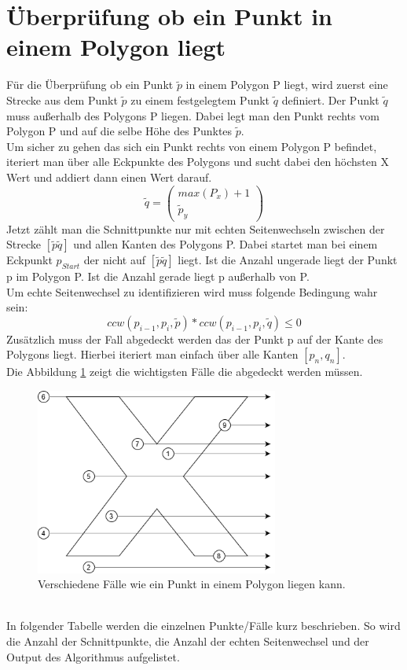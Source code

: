 \documentclass[conference]{IEEEtran}
\begin{document}
	\section{Überprüfung ob ein Punkt in einem Polygon liegt}
	Für die Überprüfung ob ein Punkt $\tilde{p}$ in einem Polygon P liegt, wird zuerst eine Strecke aus dem Punkt $\tilde{p}$ zu einem festgelegtem Punkt $\tilde{q}$ definiert. Der Punkt $\tilde{q}$ muss außerhalb des Polygons P liegen. Dabei legt man den Punkt rechts vom Polygon P und auf die selbe Höhe des Punktes $\tilde{p}$.\\
	Um sicher zu gehen das sich ein Punkt rechts von einem Polygon P befindet, iteriert man über alle Eckpunkte des Polygons und sucht dabei den höchsten X Wert und addiert dann einen Wert darauf.\\
	\[ \tilde{q} = \left(\begin{array}{c}max(P_x)+1\\\tilde{p}_y\end{array}\right) \]
	Jetzt zählt man die Schnittpunkte nur mit echten Seitenwechseln zwischen der Strecke $[\tilde{p}\tilde{q}]$ und allen Kanten des Polygons P. Dabei startet man bei einem Eckpunkt $p_{Start}$ der nicht auf $[\tilde{p}\tilde{q}]$ liegt. Ist die Anzahl ungerade liegt der Punkt p im Polygon P. Ist die Anzahl gerade liegt p außerhalb von P.\\
	Um echte Seitenwechsel zu identifizieren wird muss folgende Bedingung wahr sein:
	\[ ccw(p_{i-1} , p_i, \tilde{p}) * ccw(p_{i-1} , p_i, \tilde{q}) \leq 0 \]
	Zusätzlich muss der Fall abgedeckt werden das der Punkt p auf der Kante des Polygons liegt. Hierbei iteriert man einfach über alle Kanten $[p_n,q_n]$.\\
	Die Abbildung \ref{PointInPoly} zeigt die wichtigsten Fälle die abgedeckt werden müssen.
	\begin{figure}[h]
		\begin{center}
			\includegraphics[width=8cm]{PointInPolygon.png}
			\caption{Verschiedene Fälle wie ein Punkt in einem Polygon liegen kann.}
			\label{PointInPoly}
		\end{center}
	\end{figure}\\
	In folgender Tabelle werden die einzelnen Punkte/Fälle kurz beschrieben. So wird die Anzahl der Schnittpunkte, die Anzahl der echten Seitenwechsel und der Output des Algorithmus aufgelistet.\\
	
\end{document}
